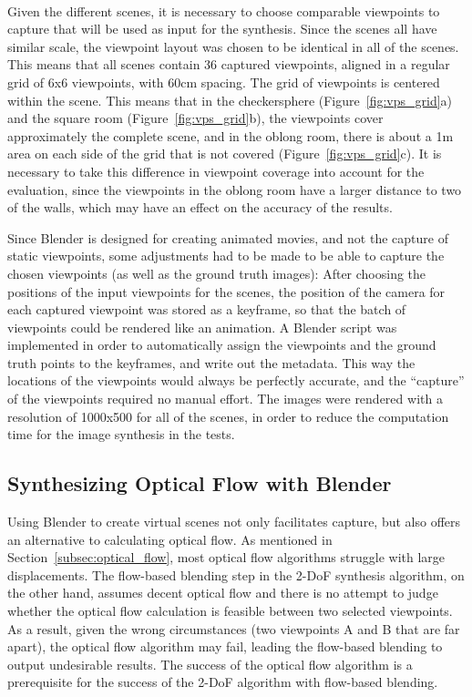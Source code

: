 \paragraph{}
Given the different scenes, it is necessary to choose comparable viewpoints to capture that will be used as input for the synthesis. Since the scenes all have similar scale, the viewpoint layout was chosen to be identical in all of the scenes. This means that all scenes contain 36 captured viewpoints, aligned in a regular grid of 6x6 viewpoints, with 60cm spacing. The grid of viewpoints is centered within the scene. This means that in the checkersphere (Figure~\ref{fig:vps_grid}a) and the square room (Figure~\ref{fig:vps_grid}b), the viewpoints cover approximately the complete scene, and in the oblong room, there is about a 1m area on each side of the grid that is not covered (Figure~\ref{fig:vps_grid}c). It is necessary to take this difference in viewpoint coverage into account for the evaluation, since the viewpoints in the oblong room have a larger distance to two of the walls, which may have an effect on the accuracy of the results.

Since Blender is designed for creating animated movies, and not the capture of static viewpoints, some adjustments had to be made to be able to capture the chosen viewpoints (as well as the ground truth images): After choosing the positions of the input viewpoints for the scenes, the position of the camera for each captured viewpoint was stored as a keyframe, so that the batch of viewpoints could be rendered like an animation. A Blender script was implemented in order to automatically assign the viewpoints and the ground truth points to the keyframes, and write out the metadata. This way the locations of the viewpoints would always be perfectly accurate, and the ``capture'' of the viewpoints required no manual effort. The images were rendered with a resolution of 1000x500 for all of the scenes, in order to reduce the computation time for the image synthesis in the tests.

\subsection{Synthesizing Optical Flow with Blender} \label{subsec:gt_of}
Using Blender to create virtual scenes not only facilitates capture, but also offers an alternative to calculating optical flow. As mentioned in Section~\ref{subsec:optical_flow}, most optical flow algorithms struggle with large displacements. The flow-based blending step in the 2-DoF synthesis algorithm, on the other hand, assumes decent optical flow and there is no attempt to judge whether the optical flow calculation is feasible between two selected viewpoints. As a result, given the wrong circumstances (two viewpoints A and B that are far apart), the optical flow algorithm may fail, leading the flow-based blending to output undesirable results. The success of the optical flow algorithm is a prerequisite for the success of the 2-DoF algorithm with flow-based blending.

